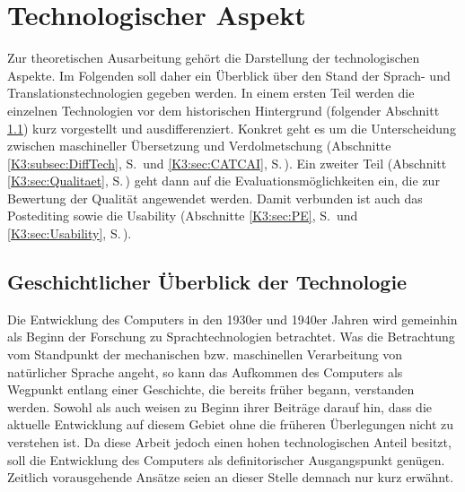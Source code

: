 \chapter{Technologischer Aspekt}\label{K3} %
\begin{sloppypar}
Zur theoretischen Ausarbeitung gehört die Darstellung der technologischen Aspekte. Im Folgenden soll daher ein Überblick über den Stand der Sprach- und Translationstechnologien gegeben werden. In einem ersten Teil werden die einzelnen Technologien vor dem historischen Hintergrund (folgender Abschnitt \ref{K3:sec:Geschichte-Technologie}) kurz vorgestellt und ausdifferenziert. Konkret geht es um die Unterscheidung zwischen maschineller Übersetzung und Verdolmetschung (Abschnitte \ref{K3:subsec:DiffTech}, S.\,\pageref{K3:subsec:DiffTech} und \ref{K3:sec:CATCAI}, S.\,\pageref{K3:sec:CATCAI}). Ein zweiter Teil (Abschnitt \ref{K3:sec:Qualitaet}, S.\,\pageref{K3:sec:Qualitaet}) geht dann auf die Evaluationsmöglichkeiten ein, die zur Bewertung der Qualität angewendet werden. Damit verbunden ist auch das Postediting sowie die Usability (Abschnitte \ref{K3:sec:PE}, S.\,\pageref{K3:sec:PE} und \ref{K3:sec:Usability}, S.\,\pageref{K3:sec:Usability}).
\end{sloppypar}


\section{Geschichtlicher Überblick der Technologie}

\label{K3:sec:Geschichte-Technologie}



Die Entwicklung des Computers in den 1930er und 1940er Jahren wird gemeinhin als Beginn der Forschung zu Sprachtechnologien betrachtet. Was die Betrachtung vom Standpunkt der mechanischen bzw. maschinellen Verarbeitung von natürlicher Sprache angeht, so kann das Aufkommen des Computers als Wegpunkt entlang einer Geschichte, die bereits früher begann, verstanden werden. Sowohl \citet[5]{stein_machine_2013} als auch \citet[431, 434]{hutchins_machine_1995} weisen zu Beginn ihrer Beiträge darauf hin, dass die aktuelle Entwicklung auf diesem Gebiet ohne die früheren Überlegungen nicht zu verstehen ist. Da diese Arbeit jedoch einen hohen technologischen Anteil besitzt, soll die Entwicklung des Computers als definitorischer Ausgangspunkt genügen. Zeitlich vorausgehende Ansätze seien an dieser Stelle demnach nur kurz erwähnt.

